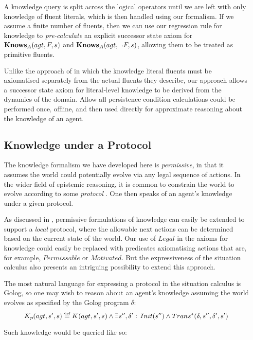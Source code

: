 A knowledge query is split across the logical operators until we are
left with only knowledge of fluent literals, which is then handled
using our formalism. If we assume a finite number of fluents, then
we can use our regression rule for knowledge to \emph{pre-calculate}
an explicit successor state axiom for $\mathbf{Knows}_{A}(agt,F,s)$ and $\mathbf{Knows}_{A}(agt,\neg F,s)$,
allowing them to be treated as primitive fluents.

Unlike the approach of \citep{demolombe00tractable_sc_belief} in
which the knowledge literal fluents must be axiomatised separately
from the actual fluents they describe, our approach allows a successor
state axiom for literal-level knowledge to be derived from the dynamics
of the domain. Allow all persistence condition calculations could
be performed once, offline, and then used directly for approximate
reasoning about the knowledge of an agent.


\subsection{Knowledge under a Protocol}

The knowledge formalism we have developed here is \emph{permissive},
in that it assumes the world could potentially evolve via any legal
sequence of actions. In the wider field of epistemic reasoning, it
is common to constrain the world to evolve according to some \emph{protocol}
\citep{halpern90knowledge_distrib,fagin95,vanBentham06tree_of_knowledge}.
One then speaks of an agent's knowledge under a given protocol.

As discussed in \citep{vanBentham06tree_of_knowledge}, permissive
formulations of knowledge can easily be extended to support a \emph{local}
protocol, where the allowable next actions can be determined based
on the current state of the world. Our use of $Legal$ in the axioms
for knowledge could easily be replaced with predicates axiomatising
actions that are, for example, $Permissable$ or $Motivated$. But
the expressiveness of the situation calculus also presents an intriguing
possibility to extend this approach.

The most natural language for expressing a protocol in the situation
calculus is Golog, so one may wish to reason about an agent's knowledge
assuming the world evolves as specified by the Golog program $\delta$:\[
K_{p}(agt,s',s)\stackrel{\mbox{\tiny def}}{=} K(agt,s',s)\wedge\exists s'',\delta':\, Init(s'')\wedge Trans^{*}(\delta,s'',\delta',s')\]


Such knowledge would be queried like so:

